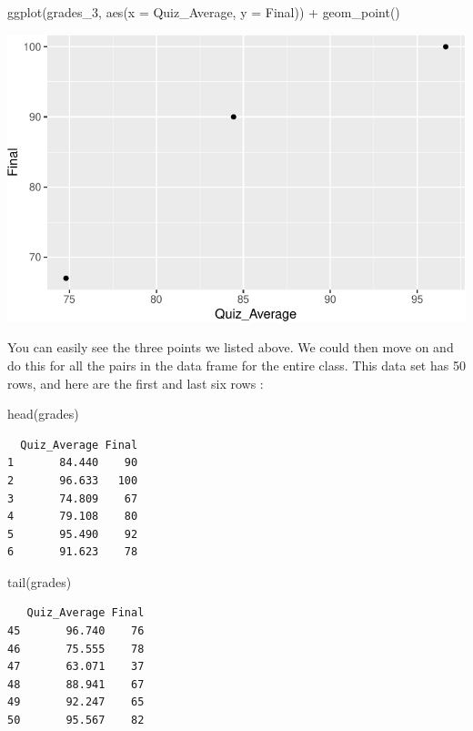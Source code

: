\documentclass[
  letterpaper,
  DIV=11,
  numbers=noendperiod]{scrreprt}
\newenvironment{Shaded}{\begin{snugshade}}{\end{snugshade}}
\newcommand{\AttributeTok}[1]{\textcolor[rgb]{0.40,0.45,0.13}{#1}}
\newcommand{\FunctionTok}[1]{\textcolor[rgb]{0.28,0.35,0.67}{#1}}
\newcommand{\NormalTok}[1]{\textcolor[rgb]{0.00,0.23,0.31}{#1}}
\newcommand{\SpecialCharTok}[1]{\textcolor[rgb]{0.37,0.37,0.37}{#1}}
\begin{document}
\begin{Shaded}
\begin{Highlighting}[]
\FunctionTok{ggplot}\NormalTok{(grades\_3, }\FunctionTok{aes}\NormalTok{(}\AttributeTok{x =}\NormalTok{ Quiz\_Average, }\AttributeTok{y =}\NormalTok{ Final)) }\SpecialCharTok{+}
  \FunctionTok{geom\_point}\NormalTok{()}
\end{Highlighting}
\end{Shaded}

\includegraphics{Scatterplots_and_Correlation_files/figure-pdf/unnamed-chunk-2-1.pdf}

You can easily see the three points we listed above. We could then move
on and do this for all the pairs in the data frame for the entire class.
This data set has 50 rows, and here are the first and last six rows :

\begin{Shaded}
\begin{Highlighting}[]
\FunctionTok{head}\NormalTok{(grades)}
\end{Highlighting}
\end{Shaded}

\begin{verbatim}
  Quiz_Average Final
1       84.440    90
2       96.633   100
3       74.809    67
4       79.108    80
5       95.490    92
6       91.623    78
\end{verbatim}

\begin{Shaded}
\begin{Highlighting}[]
\FunctionTok{tail}\NormalTok{(grades)}
\end{Highlighting}
\end{Shaded}

\begin{verbatim}
   Quiz_Average Final
45       96.740    76
46       75.555    78
47       63.071    37
48       88.941    67
49       92.247    65
50       95.567    82
\end{verbatim}
\end{document}
